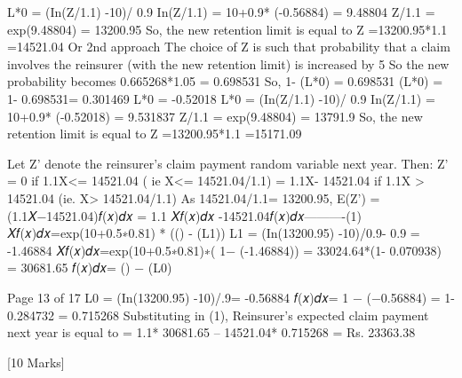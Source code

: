 L*0 = (In(Z/1.1) -10)/ 0.9
In(Z/1.1) = 10+0.9* (-0.56884) = 9.48804
Z/1.1 = exp(9.48804) = 13200.95
So, the new retention limit is equal to Z =13200.95*1.1 =14521.04
Or
2nd approach
The choice of Z is such that probability that a claim involves the reinsurer (with the new retention limit) is increased by 5%
So the new probability becomes 0.665268*1.05 = 0.698531
So, 1- \Phi(L*0) = 0.698531
\Phi(L*0) = 1- 0.698531= 0.301469
L*0 = -0.52018
L*0 = (In(Z/1.1) -10)/ 0.9
In(Z/1.1) = 10+0.9* (-0.52018) = 9.531837
Z/1.1 = exp(9.48804) = 13791.9
So, the new retention limit is equal to Z =13200.95*1.1 =15171.09

\item
Let Z’ denote the reinsurer’s claim payment random variable next year. Then:
Z’ = 0 if 1.1X<= 14521.04 ( ie X<= 14521.04/1.1)
= 1.1X- 14521.04 if 1.1X > 14521.04 (ie. X> 14521.04/1.1)
As 14521.04/1.1= 13200.95,
E(Z’) = \int  (1.1𝑋−14521.04)𝑓(𝑥)𝑑𝑥
= 1.1 \int  𝑋𝑓(𝑥)𝑑𝑥 -14521.04\int  𝑓(𝑥)𝑑𝑥----------(1)
\int  𝑋𝑓(𝑥)𝑑𝑥=exp(10+0.5∗0.81) * (\Phi(\infty) - \Phi(L1))
L1 = (In(13200.95) -10)/0.9- 0.9
= -1.46884
\int  𝑋𝑓(𝑥)𝑑𝑥=exp(10+0.5∗0.81)∗( 1− \Phi(-1.46884))
= 33024.64*(1- 0.070938)
= 30681.65
\int  𝑓(𝑥)𝑑𝑥= \Phi(\infty) − \Phi(L0)

Page 13 of 17
L0 = (In(13200.95) -10)/.9= -0.56884
\int  𝑓(𝑥)𝑑𝑥= 1 − \Phi(−0.56884) = 1-0.284732 = 0.715268
Substituting in (1),
Reinsurer’s expected claim payment next year is equal to
= 1.1* 30681.65 – 14521.04* 0.715268
= Rs. 23363.38

[10 Marks]
